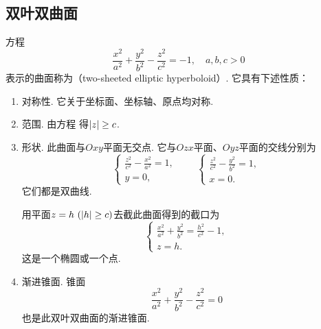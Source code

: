\subsection{双叶双曲面}
方程\begin{equation}\label{equation:解析几何.双叶双曲面}
	\frac{x^2}{a^2}+\frac{y^2}{b^2}-\frac{z^2}{c^2}=-1,
	\quad a,b,c>0
\end{equation}
表示的曲面称为（two-sheeted elliptic hyperboloid）.
它具有下述性质：
\begin{enumerate}
	\item 对称性.
	它关于坐标面、坐标轴、原点均对称.

	\item 范围.
	由方程  得\(\abs{z} \geq c\).

	\item 形状.
	此曲面与\(Oxy\)平面无交点.
	它与\(Ozx\)平面、\(Oyz\)平面的交线分别为\begin{equation*}
		\left\{ \begin{array}{l}
			\frac{z^2}{c^2}-\frac{x^2}{a^2}=1, \\
			y = 0,
		\end{array} \right.
		\qquad
		\left\{ \begin{array}{l}
			\frac{z^2}{c^2}-\frac{y^2}{b^2}=1, \\
			x = 0.
		\end{array} \right.
	\end{equation*}
	它们都是双曲线.

	用平面\(z=h\ (\abs{h}\geq c)\)去截此曲面得到的截口为\begin{equation*}
		\left\{ \begin{array}{l}
			\frac{x^2}{a^2}+\frac{y^2}{b^2}=\frac{h^2}{c^2}-1, \\
			z = h.
		\end{array} \right.
	\end{equation*}
	这是一个椭圆或一个点.

	\item 渐进锥面.
	锥面\begin{equation*}
		\frac{x^2}{a^2}+\frac{y^2}{b^2}-\frac{z^2}{c^2}=0
	\end{equation*}也是此双叶双曲面的渐进锥面.
\end{enumerate}

